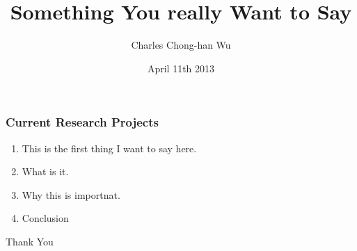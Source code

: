 \documentclass{beamer}
\title{Something You really Want to Say}
\author{Charles Chong-han Wu}
\institute{Department of Political Science\\University of South Carolina}
\date{April 11th 2013}
\begin{document}
\begin{frame}
\titlepage
\end{frame}









\begin{frame}
\frametitle{Current Research Projects}
\begin{enumerate}
	\item This is the first thing I want to say here. 
	\item \alert{What is it.}
	\item \alert{Why this is importnat.}
	\item Conclusion 
\end{enumerate}

\begin{center}
Thank You
\end{center}
\end{frame}
\end{document}
